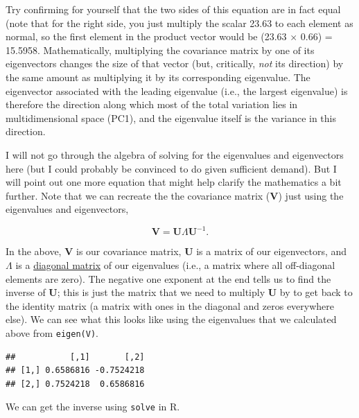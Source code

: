 \documentclass[]{article}
\newenvironment{Shaded}{\begin{snugshade}}{\end{snugshade}}
\newcommand{\KeywordTok}[1]{\textcolor[rgb]{0.13,0.29,0.53}{\textbf{#1}}}
\newcommand{\NormalTok}[1]{#1}
\newcommand{\OperatorTok}[1]{\textcolor[rgb]{0.81,0.36,0.00}{\textbf{#1}}}
\newcommand{\StringTok}[1]{\textcolor[rgb]{0.31,0.60,0.02}{#1}}
\begin{document}
Try confirming for yourself that the two sides of this equation are in
fact equal (note that for the right side, you just multiply the scalar
23.63 to each element as normal, so the first element in the product
vector would be (23.63 \(\times\) 0.66) = 15.5958. Mathematically,
multiplying the covariance matrix by one of its eigenvectors changes the
size of that vector (but, critically, \emph{not} its direction) by the
same amount as multiplying it by its corresponding eigenvalue. The
eigenvector associated with the leading eigenvalue (i.e., the largest
eigenvalue) is therefore the direction along which most of the total
variation lies in multidimensional space (PC1), and the eigenvalue
itself is the variance in this direction.

I will not go through the algebra of solving for the eigenvalues and
eigenvectors here (but I could probably be convinced to do given
sufficient demand). But I will point out one more equation that might
help clarify the mathematics a bit further. Note that we can recreate
the the covariance matrix (\(\textbf{V}\)) just using the eigenvalues
and eigenvectors,

\[\textbf{V} = \textbf{U}\Lambda\textbf{U}^{-1}.\]

In the above, \(\textbf{V}\) is our covariance matrix, \(\textbf{U}\) is
a matrix of our eigenvectors, and \(\Lambda\) is a
\href{https://en.wikipedia.org/wiki/Diagonal_matrix}{diagonal matrix} of
our eigenvalues (i.e., a matrix where all off-diagonal elements are
zero). The negative one exponent at the end tells us to find the inverse
of \(\textbf{U}\); this is just the matrix that we need to multiply
\(\textbf{U}\) by to get back to the identity matrix (a matrix with ones
in the diagonal and zeros everywhere else). We can see what this looks
like using the eigenvalues that we calculated above from
\texttt{eigen(V)}.

\begin{Shaded}
\end{Shaded}

\begin{verbatim}
##           [,1]       [,2]
## [1,] 0.6586816 -0.7524218
## [2,] 0.7524218  0.6586816
\end{verbatim}

We can get the inverse using \texttt{solve} in R.
\end{document}
